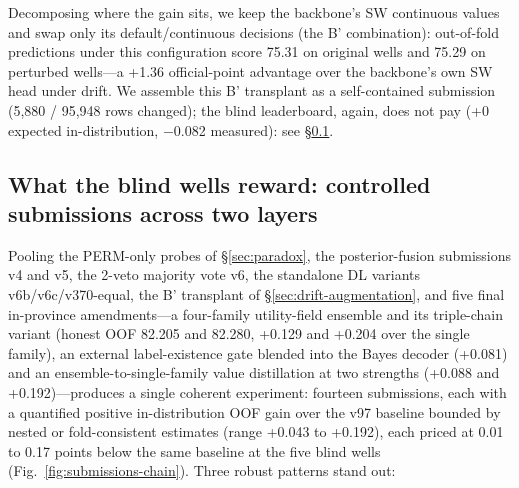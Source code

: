 \documentclass[preprint,12pt]{elsarticle}
\begin{document}
Decomposing where the gain sits, we keep the backbone's SW continuous values and swap only its default/continuous decisions (the B' combination): out-of-fold predictions under this configuration score 75.31 on original wells and 75.29 on perturbed wells---a +1.36 official-point advantage over the backbone's own SW head under drift. We assemble this B' transplant as a self-contained submission (5,880 / 95,948 rows changed); the blind leaderboard, again, does not pay (+0 expected in-distribution, $-$0.082 measured): see \S\ref{sec:nine-submissions}.

\subsection{What the blind wells reward: controlled submissions across two layers}
\label{sec:nine-submissions}

Pooling the PERM-only probes of \S\ref{sec:paradox}, the posterior-fusion submissions v4 and v5, the 2-veto majority vote v6, the standalone DL variants v6b/v6c/v370-equal, the B' transplant of \S\ref{sec:drift-augmentation}, and five final in-province amendments---a four-family utility-field ensemble and its triple-chain variant (honest OOF 82.205 and 82.280, +0.129 and +0.204 over the single family), an external label-existence gate blended into the Bayes decoder (+0.081) and an ensemble-to-single-family value distillation at two strengths (+0.088 and +0.192)---produces a single coherent experiment: fourteen submissions, each with a quantified positive in-distribution OOF gain over the v97 baseline bounded by nested or fold-consistent estimates (range +0.043 to +0.192), each priced at 0.01 to 0.17 points below the same baseline at the five blind wells (Fig.~\ref{fig:submissions-chain}). Three robust patterns stand out:
\end{document}
